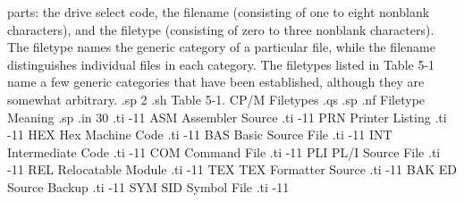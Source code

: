 parts: the drive select code, the filename (consisting of one to 
eight nonblank characters), and the filetype (consisting of zero 
to three nonblank characters).  The filetype names the generic 
category of a particular file, while the filename distinguishes 
individual files in each category.  The filetypes listed in Table 5-1 
name a few generic categories that have been established, 
although they are somewhat arbitrary.
.sp 2
.sh
                   Table 5-1.  CP/M Filetypes
.qs
.sp
.nf
                Filetype           Meaning
.sp
.in 30
.ti -11
ASM        Assembler Source
.ti -11
PRN        Printer Listing
.ti -11
HEX        Hex Machine Code
.ti -11
BAS        Basic Source File
.ti -11
INT        Intermediate Code
.ti -11
COM        Command File
.ti -11
PLI        PL/I Source File
.ti -11
REL        Relocatable Module
.ti -11
TEX        TEX Formatter Source
.ti -11
BAK        ED Source Backup
.ti -11
SYM        SID Symbol File
.ti -11
